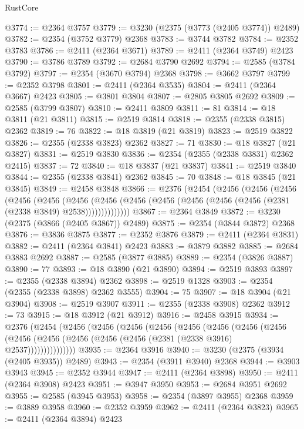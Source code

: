 \begin{lexlean}{RustCore}
\begin{coremodule}
@3774 := @2364 @3757
@3779 := @3230 (@2375 (@3773 (@2405 @3774)) @2489)
@3782 := @2354 (@3752 @3779) @2368
@3783 := @3744 @3782
@3784 := @2352 @3783
@3786 := @2411 (@2364 @3671)
@3789 := @2411 (@2364 @3749) @2423
@3790 := @3786 @3789
@3792 := @2684 @3790 @2692
@3794 := @2585 (@3784 @3792)
@3797 := @2354 (@3670 @3794) @2368
@3798 := @3662 @3797
@3799 := @2352 @3798
@3801 := @2411 (@2364 @3535)
@3804 := @2411 (@2364 @3667) @2423
@3805 := @3801 @3804
@3807 := @2805 @3805 @2692
@3809 := @2585 (@3799 @3807)
@3810 := @2411 @3809
@3811 := 81
@3814 := @18 @3811 (@21 @3811)
@3815 := @2519 @3814
@3818 := @2355 (@2338 @3815) @2362
@3819 := 76
@3822 := @18 @3819 (@21 @3819)
@3823 := @2519 @3822
@3826 := @2355 (@2338 @3823) @2362
@3827 := 71
@3830 := @18 @3827 (@21 @3827)
@3831 := @2519 @3830
@3836 := @2354 (@2355 (@2338 @3831) @2362 @2415)
@3837 := 72
@3840 := @18 @3837 (@21 @3837)
@3841 := @2519 @3840
@3844 := @2355 (@2338 @3841) @2362
@3845 := 70
@3848 := @18 @3845 (@21 @3845)
@3849 := @2458 @3848
@3866 := @2376
    (@2454
      (@2456
        (@2456
          (@2456
            (@2456
              (@2456
                (@2456
                  (@2456 (@2456 (@2456 (@2456 (@2456 (@2456 (@2381 (@2338 @3849) @2538))))))))))))))
@3867 := @2364 @3849
@3872 := @3230 (@2375 (@3866 (@2405 @3867)) @2489)
@3875 := @2354 (@3844 @3872) @2368
@3876 := @3836 @3875
@3877 := @2352 @3876
@3879 := @2411 (@2364 @3831)
@3882 := @2411 (@2364 @3841) @2423
@3883 := @3879 @3882
@3885 := @2684 @3883 @2692
@3887 := @2585 (@3877 @3885)
@3889 := @2354 (@3826 @3887)
@3890 := 77
@3893 := @18 @3890 (@21 @3890)
@3894 := @2519 @3893
@3897 := @2355 (@2338 @3894) @2362
@3898 := @2519 @1328
@3903 := @2354 (@2355 (@2338 @3898) @2362 @3555)
@3904 := 75
@3907 := @18 @3904 (@21 @3904)
@3908 := @2519 @3907
@3911 := @2355 (@2338 @3908) @2362
@3912 := 73
@3915 := @18 @3912 (@21 @3912)
@3916 := @2458 @3915
@3934 := @2376
    (@2454
      (@2456
        (@2456
          (@2456
            (@2456
              (@2456
                (@2456
                  (@2456
                    (@2456
                      (@2456 (@2456 (@2456 (@2456 (@2456 (@2381 (@2338 @3916) @2537)))))))))))))))
@3935 := @2364 @3916
@3940 := @3230 (@2375 (@3934 (@2405 @3935)) @2489)
@3943 := @2354 (@3911 @3940) @2368
@3944 := @3903 @3943
@3945 := @2352 @3944
@3947 := @2411 (@2364 @3898)
@3950 := @2411 (@2364 @3908) @2423
@3951 := @3947 @3950
@3953 := @2684 @3951 @2692
@3955 := @2585 (@3945 @3953)
@3958 := @2354 (@3897 @3955) @2368
@3959 := @3889 @3958
@3960 := @2352 @3959
@3962 := @2411 (@2364 @3823)
@3965 := @2411 (@2364 @3894) @2423

\end{coremodule}
\end{lexlean}
